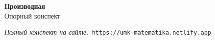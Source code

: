 \documentclass{umk-matematika}
\begin{document}
\begin{center}
{\Large\bfseries Производная}
\\[0.3cm]{\large Опорный конспект}
\end{center}
\vspace{0.5cm}

\begin{center}
\textit{Полный конспект на сайте:}\
\texttt{https://umk-matematika.netlify.app}
\end{center}
\end{document}
